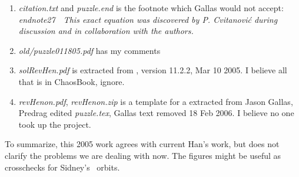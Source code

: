 \begin{enumerate}
They published in {\em Reductions and simplifications of
orbital sums in a {Hamiltonian} repeller} without me as a
coauthor. Algebraic number expressions for periodic points
show interesting patterns, their eqs.~(22),
(23) and (28), that would not be noticed from their numerical values.

They use binary labelling also in Endler and Gallas {\em
Conjugacy classes and chiral doublets in the {H{\'e}non Hamiltonian}
repeller}, without mentioning me or ChaosBook at all.

  \item
{\em citation.txt} and {\em puzzle.end} is the footnote which Gallas
would not accept:
{\em endnote27}~~{\em This exact equation was discovered by P.
Cvitanovi\'c during discussion and in collaboration with the authors. }

  \item
{\em old/puzzle011805.pdf} has my comments

  \item
{\em solRevHen.pdf} is extracted from
, version 11.2.2, Mar 10 2005. I believe all that is
in ChaosBook, ignore.

  \item
{\em revHenon.pdf}, {\em revHenon.zip} is a template for a
 extracted from Jason Gallas, Predrag edited \emph{puzzle.tex},
Gallas text	removed 18 Feb 2006.
I believe no one took up the project.
\end{enumerate}

To summarize, this 2005 work agrees with current Han's work, but does not
clarify the problems we are dealing with now. The figures might be useful
as crosschecks for Sidney's \Henon\ orbits.

\bigskip

